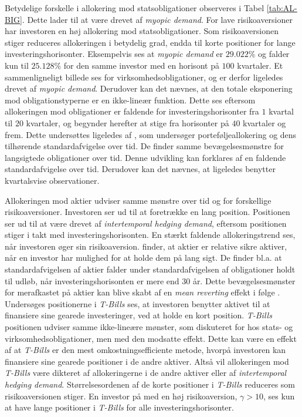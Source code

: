 \documentclass[
  a4paper,
  oneside]{memoir}
\begin{document}
Betydelige forskelle i allokering mod statsobligationer observeres i Tabel \ref{tab:AL-BIG}. Dette lader til at være drevet af \emph{myopic demand}. For lave risikoaversioner har investoren en høj allokering mod statsobligationer. Som risikoaversionen stiger reduceres allokeringen i betydelig grad, endda til korte positioner for lange investeringshorisonter. Eksempelvis ses at \emph{myopic demand} er \(29.022\%\) og falder kun til \(25.128\%\) for den samme investor med en horisont på \(100\) kvartaler. Et sammenligneligt billede ses for virksomhedsobligationer, og er derfor ligeledes drevet af \emph{myopic demand}. Derudover kan det nævnes, at den totale eksponering mod obligationstyperne er en ikke-lineær funktion. Dette ses eftersom allokeringen mod obligationer er faldende for investeringshorisonter fra \(1\) kvartal til \(20\) kvartaler, og begynder herefter at stige fra horisonter på \(40\) kvartaler og frem. Dette undersøttes ligeledes af \citep{CampVic2003}, som undersøger porteføljeallokering og dens tilhørende standardafvigelse over tid. De finder samme bevægelsesmønstre for langsigtede obligationer over tid. Denne udvikling kan forklares af en faldende standardafvigelse over tid. Derudover kan det nævnes, at \citep{CampVic2003} ligeledes benytter kvartalsvise observationer.

Allokeringen mod aktier udviser samme mønstre over tid og for forskellige risikoaversioner. Investoren ser ud til at foretrække en lang position. Positionen ser ud til at være drevet af \emph{intertemporal hedging demand}, eftersom positionen stiger i takt med investeringshorisonten. En stærkt faldende allokeringstrend ses, når investoren øger sin risikoaversion. \citep{CampVic2003} finder, at aktier er relative sikre aktiver, når en investor har mulighed for at holde dem på lang sigt. De finder bl.a. at standardafvigelsen af aktier falder under standardafvigelsen af obligationer holdt til udløb, når investeringshorisonten er mere end \(30\) år. Dette bevægelsesmønster for merafkastet på aktier kan blive skabt af en \emph{mean reverting} effekt i følge \citep{CampVic2003}.\\
Undersøges positionerne i \emph{T-Bills} ses, at investoren benytter aktivet til at finansiere sine gearede investeringer, ved at holde en kort position. \emph{T-Bills} positionen udviser samme ikke-lineære mønster, som diskuteret for hos stats- og virksomhedsobligationer, men med den modsatte effekt. Dette kan være en effekt af at \emph{T-Bills} er den mest omkostningsefficiente metode, hvorpå investoren kan finansiere sine gearede positioner i de andre aktiver. Altså vil allokeringen mod \emph{T-Bills} være dikteret af allokeringerne i de andre aktiver eller af \emph{intertemporal hedging demand}. Størrelsesordenen af de korte positioner i \emph{T-Bills} reduceres som risikoaversionen stiger. En investor på med en høj risikoaversion, \(\gamma>10\), ses kun at have lange positioner i \emph{T-Bills} for alle investeringshorisonter.
\end{document}
